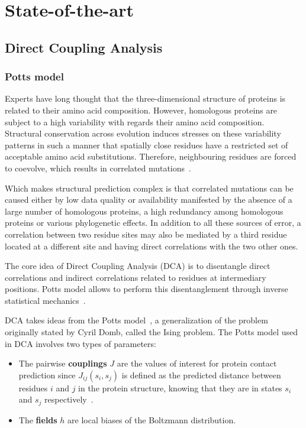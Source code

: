 \chapter{State-of-the-art}

\section{Direct Coupling Analysis}

    \subsection{Potts model} \label{potts}

        Experts have long thought that the three-dimensional structure of proteins
        is related to their amino acid composition. However, homologous proteins
        are subject to a high variability with regards their amino acid composition.
        Structural conservation across evolution induces stresses on these variability
        patterns in such a manner that spatially close residues have a restricted set
        of acceptable amino acid substitutions. Therefore, neighbouring residues
        are forced to coevolve, which results in correlated mutations~\cite{Morcos2014}.

        Which makes structural prediction complex is that correlated mutations can
        be caused either by low data quality or availability manifested by the absence
        of a large number of homologous proteins, a high redundancy among homologous
        proteins or various phylogenetic effects. In addition to all these sources
        of error, a correlation between two residue sites may also be mediated by a third
        residue located at a different site and having direct correlations with the two
        other ones.

        The core idea of Direct Coupling Analysis (DCA) is to disentangle direct
        correlations and indirect correlations related to residues at intermediary positions.
        Potts model allows to perform this disentanglement through inverse
        statistical mechanics~\cite{PhysRevE.87.012707}.

        DCA takes ideas from the Potts model~\cite{wu1982potts}, a generalization of the
        problem originally stated by Cyril Domb, called the Ising problem.
        The Potts model used in DCA involves two types of parameters:
        \begin{itemize}
            \item The pairwise \textbf{couplings} $J$ are the values of interest
                for protein contact prediction since $J_{ij}(s_i, s_j)$ is defined
                as the predicted distance between residues $i$ and $j$ in the protein structure,
                knowing that they are in states $s_i$ and $s_j$ respectively~\cite{morcos2011direct}.
            \item The \textbf{fields} $h$ are local biases of the Boltzmann distribution.
        \end{itemize}

